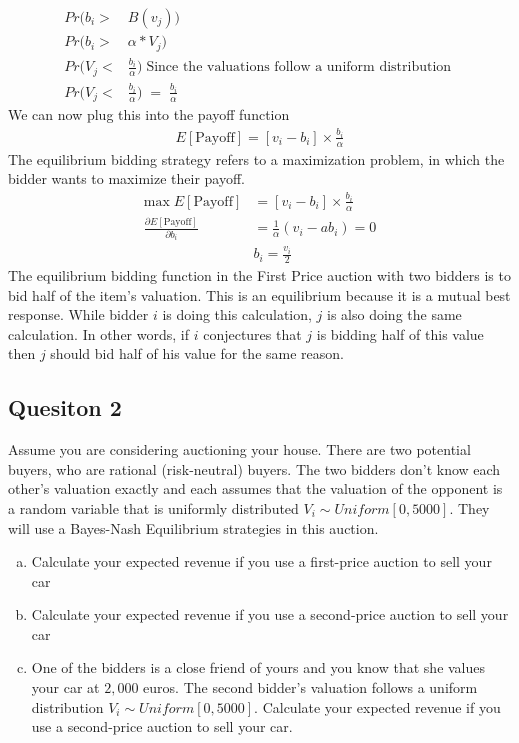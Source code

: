 \documentclass[11pt]{article} %
\begin{document}
        \begin{align*}
         Pr(b_i > & B(v_j)) \\
         Pr(b_i > & \alpha*V_j) \\
         Pr \Big(V_j < & \frac{b_i}{\alpha} \Big) \; \text{Since the valuations follow a uniform distribution } \\
         Pr \Big(V_j < & \frac{b_i}{\alpha} \Big) \; = \; \frac{b_i}{\alpha} 
       \end{align*}
        We can now plug this into the payoff function
        \begin{align*}
            E[\text{Payoff}] = [v_i - b_i] \times  \frac{b_i}{\alpha} 
        \end{align*}
        The equilibrium bidding strategy refers to a maximization problem, in which the bidder wants to maximize their payoff.
        \begin{align*}
          \text{max} \; E[\text{Payoff}] & = [v_i - b_i] \times  \frac{b_i}{\alpha}  \\
          \frac{\partial E[\text{Payoff}] }{ \partial b_i} & = \frac{1}{\alpha}(v_i - a b_i) = 0 \\
          & b_i = \frac{v_i}{2}
        \end{align*}
        The equilibrium bidding function in the First Price auction with two bidders is to bid half of the item's valuation. This is an equilibrium because it is a mutual best response. While bidder $i$ is doing this calculation, $j$ is also doing the same calculation. In other words, if $i$ conjectures that $j$ is bidding half of this value then $j$ should bid half of his value for the same reason.
        
      \subsection{Quesiton 2}
      Assume you are considering auctioning your house. There are two potential buyers, who are rational (risk-neutral) buyers. The two bidders don’t know each other’s valuation exactly and each assumes that the valuation of the opponent is a random variable that is uniformly distributed $V_i \sim Uniform[0,5000]$. They will use a Bayes-Nash Equilibrium strategies in this auction.
    \begin{enumerate}[(a)] 
        \item Calculate your expected revenue if you use a first-price auction to sell your car
        \item Calculate your expected revenue if you use a second-price auction to sell your car
        \item One of the bidders is a close friend of yours and you know that she values your car at $2,000$ euros. The second bidder’s valuation follows a uniform distribution $V_i \sim Uniform[0,5000]$. Calculate your expected revenue if you use a second-price auction to sell your car.
    \end{enumerate}
      
\end{document}
